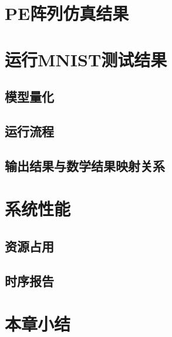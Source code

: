 \section{PE阵列仿真结果}

\section{运行MNIST测试结果}
    \subsection{模型量化}
    \subsection{运行流程}
    \subsection{输出结果与数学结果映射关系}

\section{系统性能}
    \subsection{资源占用}
    \subsection{时序报告}

\section{本章小结}






